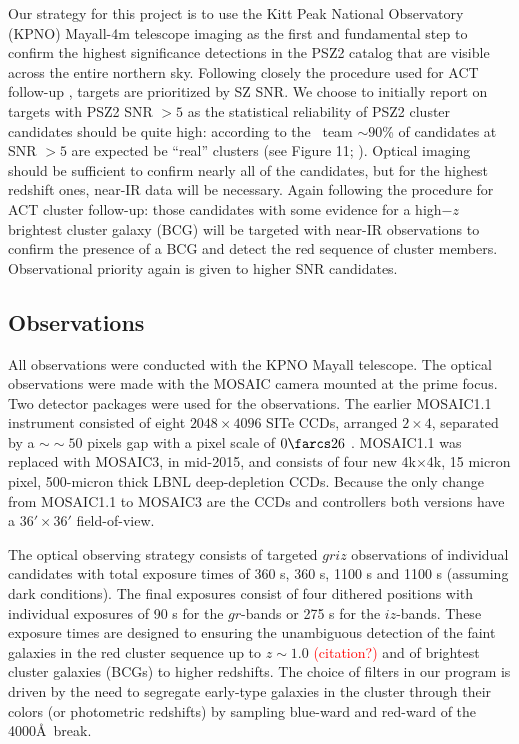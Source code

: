 \documentclass[apj, revtex4-1]{emulateapj}
\newcommand{\editorial}[1]{\textcolor{red}{#1}}
\begin{document}
Our strategy for this project is to use the Kitt Peak National Observatory (KPNO) Mayall-4m telescope imaging as the first and fundamental step to confirm the highest significance detections in the PSZ2 catalog that are visible across the entire northern sky.
%
%
Following closely the procedure used for ACT follow-up , targets are prioritized by SZ SNR. We choose to initially report on targets with PSZ2 SNR $>5$ as the statistical reliability of PSZ2 cluster candidates should be quite high: according to the \planck\ team $\sim90$\% of candidates at SNR $>5$ are expected be ``real'' clusters (see Figure 11; \citealt{PlanckCollaboration2015a}).
%
Optical imaging should be sufficient to confirm nearly all of the candidates, but for the highest redshift ones, near-IR data will be necessary. Again following the procedure for ACT cluster follow-up: those candidates with some evidence for a high$-z$ brightest cluster galaxy (BCG) will be targeted with near-IR observations to confirm the presence of a BCG and detect the red sequence of cluster members. Observational priority again is given to higher SNR candidates.

\subsection{Observations}\label{sec: observations}
All observations were conducted with the KPNO Mayall telescope. The optical observations were made with the MOSAIC camera mounted at the prime focus. Two detector packages were used for the observations. The earlier MOSAIC1.1 instrument consisted of eight $2048\times4096$ SITe CCDs, arranged $2\times4$, separated by a $∼\sim50$ pixels gap with a pixel scale of $0\farcs26$ \perpixel. MOSAIC1.1 was replaced with MOSAIC3, in mid-2015, and consists of four new 4k$\times$4k, 15 micron pixel, 500-micron thick LBNL deep-depletion CCDs. Because the only change from MOSAIC1.1 to MOSAIC3 are the CCDs and controllers both versions have a $36' \times 36'$ field-of-view.

The optical observing strategy consists of targeted $griz$ observations of individual candidates with total exposure times of 360 s, 360 s, 1100 s and 1100 s (assuming dark conditions). The final exposures consist of four dithered positions with individual exposures of 90 s for the $gr$-bands or 275 s for the $iz$-bands. These exposure times are designed to ensuring the unambiguous detection of the faint galaxies in the red cluster sequence up to $z \sim 1.0$ \editorial{(citation?)} and of brightest cluster galaxies (BCGs) to higher redshifts. The choice of filters in our program is driven by the need to segregate early-type galaxies in the cluster through their colors (or photometric redshifts) by sampling blue-ward and red-ward of the 4000\AA\ break.
\end{document}

